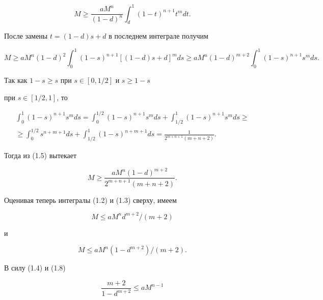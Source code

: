 \begin{pf}
$$


M \ge \frac{aM^n}{(1-d)^n} \int_d^1(1-t)^{n+1}t^mdt.


$$


После замены $t=(1-d)s+d$ в последнем интеграле получим 


\begin{equation}


M \ge aM^n(1-d)^2 \int_0^1(1-s)^{n+1}[(1-d)s+d]^mds \ge


aM^n(1 - d)^{m+2} \int_0^1(1-s)^{n+1}s^mds.


\end{equation}


Так как $1-s\ge s$ при $s\in[0,1/2]$ и $s\ge 1-s$


при $s\in[1/2,1]$, то


\begin{multline*}


\int_0^1(1-s)^{n+1}s^mds=


\int_0^{1/2}(1-s)^{n+1}s^m ds+ \int_{1/2}^1(1-s)^{n+1}s^m ds \ge \\


\ge \int_0^{1/2}s^{n+m+1}ds+ \int_{1/2}^1(1-s)^{n+m+1}ds=


\frac{1}{2^{m+n+1}(m+n+2)}.


\end{multline*}


Тогда из (1.5) вытекает


\begin{equation}


M \ge \frac{aM^n(1-d)^{m+2}}{2^{m+n+1}(m+n+2)}.


\end{equation}


Оценивая теперь интегралы (1.2) и (1.3) сверху, имеем


\begin{equation}


M \le aM^nd^{m+2}/(m+2)


\end{equation}


и


\begin{equation}


M \le aM^n(1-d^{m+2})/(m+2).


\end{equation}


В силу (1.4) и (1.8)


\begin{equation}


\frac{m+2}{1-d^{m+2}} \le aM^{n-1} 



\end{equation}
\end{pf}
